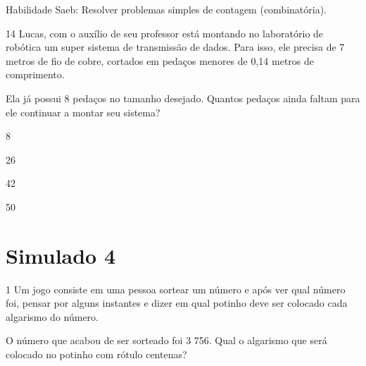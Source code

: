 {{Habilidade Saeb: Resolver problemas simples de contagem (combinatória).}

\num{14} Lucas, com o auxílio de seu professor está montando no laboratório
de robótica um super sistema de transmissão de dados. Para isso, ele
precisa de 7 metros de fio de cobre, cortados em pedaços menores de 0,14
metros de comprimento.

Ela já possui 8 pedaços no tamanho desejado. Quantos pedaços ainda
faltam para ele continuar a montar seu sistema?

\begin{escolha}
\item
  8
\item
  26
\item
  42
\item
  50
\end{escolha}


\chapter{Simulado 4}

\num{1} Um jogo consiste em uma pessoa sortear um número e após ver qual
número foi, pensar por alguns instantes e dizer em qual potinho deve ser
colocado cada algarismo do número.

%
%
%
%
%

O número que acabou de ser sorteado foi 3 756. Qual o algarismo que será
colocado no potinho com rótulo centenas?

}
